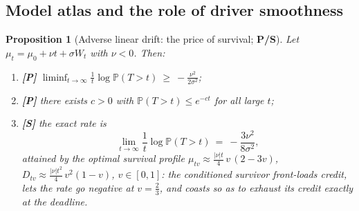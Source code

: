 \documentclass[11pt]{article}
\numberwithin{equation}{section}
\theoremstyle{plain}
\newtheorem{proposition}[theorem]{Proposition}
\theoremstyle{definition}
\theoremstyle{remark}
\newcommand{\PP}{\mathbb{P}}
\begin{document}
\subsection{Model atlas and the role of driver smoothness}
\label{sh:subsub:atlas}

\begin{proposition}[Adverse linear drift: the price of survival;
\textbf{P/S}]\label{sh:prop:advdrift}
Let $\mu_t=\mu_0+\nu t+\sigma W_t$ with $\nu<0$. Then:
\begin{enumerate}[label=\emph{(\roman*)},itemsep=1pt]
\item \textbf{[P]}
$\displaystyle\liminf_{t\to\infty}\frac1t\log\PP(T>t)\ \ge\
-\frac{\nu^2}{2\sigma^2}$;
\item \textbf{[P]} there exists $c>0$ with $\PP(T>t)\le e^{-ct}$ for all
large $t$;
\item \textbf{[S]} the exact rate is
\begin{equation}\label{sh:eq:rate}
\lim_{t\to\infty}\frac1t\log\PP(T>t)\ =\ -\frac{3\nu^2}{8\sigma^2},
\end{equation}
attained by the optimal survival profile
$\mu_{tv}\approx\tfrac{|\nu|t}{4}\,v\,(2-3v)$,
$D_{tv}\approx\tfrac{|\nu|t^2}{4}\,v^2(1-v)$, $v\in[0,1]$: the conditioned
survivor front-loads credit, lets the rate go negative at $v=\tfrac23$, and
coasts so as to exhaust its credit exactly at the deadline.
\end{enumerate}
\end{proposition}
\end{document}
